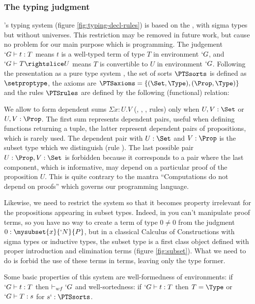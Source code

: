 \documentclass[twocolumn]{article}
\begin{document}
\subsubsection{The typing judgment}
\Russell{}'s typing system (figure \vref{fig:typing-decl-rules}) is based
on the \CCfull \cite{Barras99,Luo90}, with sigma types but without universes.
This restriction may be removed in future work, but cause no problem for
our main purpose which is programming. The judgement $`G \vdash t : T$
means $t$ is a well-typed term of type $T$ in environment $`G$, and $`G
\typed T \subd U$ means $T$ is convertible to $U$ in environment $`G$.
Following the presentation as a pure type system \cite{PTS}, 
the set of sorts $\PTSsorts$ is defined as $\setproptype$, the
axioms are $\PTSaxioms = \{ (\Set, \Type), (\Prop, \Type) \}$ and the
rules $\PTSrules$ are defined by the following (functional) relation:
\axiomsd

We allow to form dependent sums $\Sigma x : U.V$ (, ,
,  rules) only when $U, V : \Set$
or $U, V : \Prop$. The first sum represents dependent pairs, useful
when defining functions returning a tuple, the latter represent
dependent pairs of propositions, which is rarely used. The dependent
pair with $U : \Set$ and $V : \Prop$ is the subset type which we
distinguish (rule ). The last possible pair $U : \Prop, V : \Set$ is forbidden
because it corresponds to a pair where the last component, which is
informative, may depend on a particular proof of the proposition
$U$. This is quite contrary to the mantra ``Computations do not depend
on proofs'' which governs our programming language.

Likewise, we need to restrict the system so that it becomes property irrelevant for
the propositions appearing in subset types. Indeed, in \PVS{} you can't
manipulate proof terms, so you have
no way to create a term of type $0 \neq 0$ from the judgment $0 :
\mysubset{x}{`N}{P}$, but in a classical Calculus of Constructions with
sigma types or inductive types, the subset type is a first class object
defined with proper introduction and
elimination terms (figure \vref{fig:subset}). What we need to do is forbid the use of these terms
in \Russell{} terms, leaving only the type former.

Some basic properties of this system are well-formedness of
environments: if $`G \vdash t : T$ then $\vdash_{wf} `G$ and
well-sortedness: if $`G \vdash t : T$ then $T = \Type$ or $`G \vdash T :
s$ for $s `: \PTSsorts$.
\end{document}
